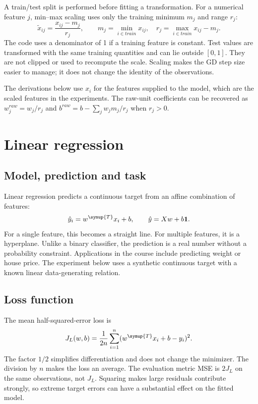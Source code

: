 A train/test split is performed before fitting a transformation. For a numerical feature $j$, min--max scaling uses only the training minimum $m_j$ and range $r_j$:
\[
\tilde x_{ij}=\frac{x_{ij}-m_j}{r_j},\qquad
m_j=\min_{i\in train}x_{ij},\quad
r_j=\max_{i\in train}x_{ij}-m_j.
\]
The code uses a denominator of 1 if a training feature is constant. Test values are transformed with the same training quantities and can lie outside $[0,1]$. They are not clipped or used to recompute the scale. Scaling makes the GD step size easier to manage; it does not change the identity of the observations.

The derivations below use $x_i$ for the features supplied to the model, which are the scaled features in the experiments. The raw-unit coefficients can be recovered as $w_j^{raw}=w_j/r_j$ and $b^{raw}=b-\sum_j w_jm_j/r_j$ when $r_j>0$.


\section{Linear regression}
\subsection{Model, prediction and task}
Linear regression predicts a continuous target from an affine combination of features:
\[
\hat y_i=w^{\symup{T}}x_i+b,\qquad \hat y=Xw+b\mathbf1.
\]
For a single feature, this becomes a straight line. For multiple features, it is a hyperplane. Unlike a binary classifier, the prediction is a real number without a probability constraint. Applications in the course include predicting weight or house price. The experiment below uses a synthetic continuous target with a known linear data-generating relation.

\subsection{Loss function}
The mean half-squared-error loss is
\[
J_L(w,b)=\frac{1}{2n}\sum_{i=1}^{n}(w^{\symup{T}}x_i+b-y_i)^2.
\]
The factor $1/2$ simplifies differentiation and does not change the minimizer. The division by $n$ makes the loss an average. The evaluation metric MSE is $2J_L$ on the same observations, not $J_L$. Squaring makes large residuals contribute strongly, so extreme target errors can have a substantial effect on the fitted model.

